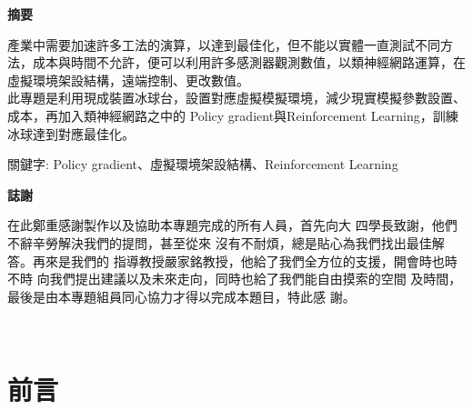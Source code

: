 \documentclass[14pt,a4paper]{report}  %
\begin{document}
\newpage
\renewcommand{\baselinestretch}{1.5} %
\clearpage  %
\sectionef
{} %
\begin{center}
\LARGE\textbf{摘要}\\
\begin{flushleft}
\fontsize{14pt}{2.5pt}\hspace{12pt} 產業中需要加速許多工法的演算，以達到最佳化，但不能以實體一直測試不同方法，成本與時間不允許，便可以利用許多感測器觀測數值，以類神經網路運算，在虛擬環境架設結構，遠端控制、更改數值。\\
\hspace{12pt} 此專題是利用現成裝置冰球台，設置對應虛擬模擬環境，減少現實模擬參數設置、成本，再加入類神經網路之中的  Policy gradient與Reinforcement Learning，訓練冰球達到對應最佳化。
\end{flushleft}
\begin{center}
\fontsize{14pt}{2.5pt}關鍵字: Policy gradient、虛擬環境架設結構、Reinforcement Learning
\end{center}
\newpage
\centerline\LARGE\textbf{誌謝}\\
\begin{flushleft}
\fontsize{14pt}{2.5pt}\hspace{12pt}在此鄭重感謝製作以及協助本專題完成的所有人員，首先向大
四學長致謝，他們不辭辛勞解決我們的提問，甚至從來
沒有不耐煩，總是貼心為我們找出最佳解答。再來是我們的
指導教授嚴家銘教授，他給了我們全方位的支援，開會時也時不時
向我們提出建議以及未來走向，同時也給了我們能自由摸索的空間
及時間，最後是由本專題組員同心協力才得以完成本題目，特此感
謝。
\end{flushleft}
\newpage
\renewcommand{\contentsname}{\centerline{\fontsize{18pt}{\baselineskip}\selectfont\textbf{目\quad 錄}}}
\tableofcontents　　%
\newpage
\renewcommand{\listfigurename}{\centerline{\fontsize{18pt}{\baselineskip}\selectfont\textbf{圖\quad 表\quad 目\quad 錄 }}}
\listoffigures
\newpage
\end{center}

\chapter{前言}
\renewcommand{\baselinestretch}{10.0} %
\setcounter{page}{1}  %
\fontsize{14pt}{2.5pt}\sectionef
\end{document}
